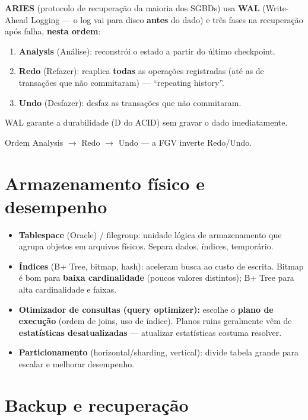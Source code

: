 \textbf{ARIES} (protocolo de recuperação da maioria dos SGBDs) usa
\textbf{WAL} (Write-Ahead Logging --- o log vai para disco \textbf{antes} do
dado) e três fases na recuperação após falha, \textbf{nesta ordem}:

\begin{enumerate}
\item \textbf{Analysis} (Análise): reconstrói o estado a partir do último
checkpoint.
\item \textbf{Redo} (Refazer): reaplica \textbf{todas} as operações
registradas (até as de transações que não commitaram) --- ``repeating
history''.
\item \textbf{Undo} (Desfazer): desfaz as transações que não commitaram.
\end{enumerate}

WAL garante a durabilidade (D do ACID) sem gravar o dado imediatamente.

\begin{pegadinha}
Ordem Analysis $\to$ Redo $\to$ Undo --- a FGV inverte Redo/Undo.
\end{pegadinha}

\section{Armazenamento físico e desempenho}

\begin{itemize}
\item \textbf{Tablespace} (Oracle) / filegroup: unidade lógica de
armazenamento que agrupa objetos em arquivos físicos. Separa dados, índices,
temporário.
\item \textbf{Índices} (B+ Tree, bitmap, hash): aceleram busca ao custo de
escrita. Bitmap é bom para \textbf{baixa cardinalidade} (poucos valores
distintos); B+ Tree para alta cardinalidade e faixas.
\item \textbf{Otimizador de consultas (query optimizer):} escolhe o
\textbf{plano de execução} (ordem de joins, uso de índice). Planos ruins
geralmente vêm de \textbf{estatísticas desatualizadas} --- atualizar
estatísticas costuma resolver.
\item \textbf{Particionamento} (horizontal/sharding, vertical): divide
tabela grande para escalar e melhorar desempenho.
\end{itemize}

\section{Backup e recuperação}

